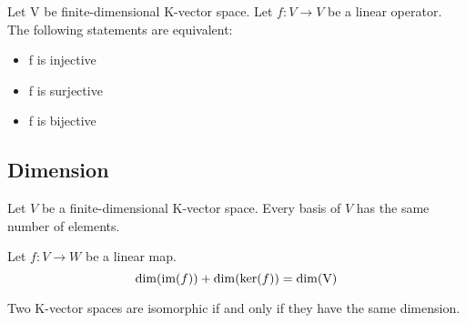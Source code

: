         \begin{theorem}
			Let V be finite-dimensional K-vector space. Let $f:V\rightarrow V$ be a linear operator. The following statements are equivalent:
            \begin{itemize}
            	\item f is injective
				\item f is surjective
                \item f is bijective
			\end{itemize}
		\end{theorem}
        
	\subsection{Dimension}
        \begin{property}
			Let $V$ be a finite-dimensional K-vector space. Every basis of $V$ has the same number of elements.
		\end{property}
        \begin{theorem}
            Let $f: V \rightarrow W$ be a linear map.
            \begin{equation}
                \label{linalgebra:dimension_theorem}
                \dim(\text{\upshape im}(f)) + \dim(\text{\upshape ker}(f)) = \dim(\text{\upshape V})
            \end{equation}
        \end{theorem}
        \begin{theorem}
        	\label{linalgebra:isomorphic_dimension}
			Two K-vector spaces are isomorphic if and only if they have the same dimension.
		\end{theorem}
